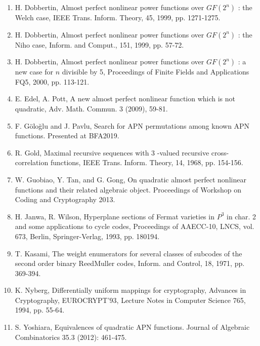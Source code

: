 \documentclass[10pt]{article}
\begin{document}
\begin{enumerate}
  \item H. Dobbertin, Almost perfect nonlinear power functions over $G F\left(2^{n}\right)$ : the Welch case, IEEE Trans. Inform. Theory, 45, 1999, pp. 1271-1275.
  \item H. Dobbertin, Almost perfect nonlinear power functions over $G F\left(2^{n}\right)$ : the Niho case, Inform. and Comput., 151, 1999, pp. 57-72.
  \item H. Dobbertin, Almost perfect nonlinear power functions over $G F\left(2^{n}\right)$ : a new case for $n$ divisible by 5, Proceedings of Finite Fields and Applications FQ5, 2000, pp. 113-121.
  \item E. Edel, A. Pott, A new almost perfect nonlinear function which is not quadratic, Adv. Math. Commun. 3 (2009), 59-81.
  \item F. Göloğlu and J. Pavlu, Search for APN permutations among known APN functions. Presented at BFA2019.
  \item R. Gold, Maximal recursive sequences with 3 -valued recursive cross-correlation functions, IEEE Trans. Inform. Theory, 14, 1968, pp. 154-156.
  \item W. Guobiao, Y. Tan, and G. Gong, On quadratic almost perfect nonlinear functions and their related algebraic object. Proceedings of Workshop on Coding and Cryptography 2013.
  \item H. Janwa, R. Wilson, Hyperplane sections of Fermat varieties in $P^{3}$ in char. 2 and some applications to cycle codes, Proceedings of AAECC-10, LNCS, vol. 673, Berlin, Springer-Verlag, 1993, pp. 180194.
  \item T. Kasami, The weight enumerators for several classes of subcodes of the second order binary ReedMuller codes, Inform. and Control, 18, 1971, pp. 369-394.
  \item K. Nyberg, Differentially uniform mappings for cryptography, Advances in Cryptography, EUROCRYPT'93, Lecture Notes in Computer Science 765, 1994, pp. 55-64.
  \item S. Yoshiara, Equivalences of quadratic APN functions. Journal of Algebraic Combinatorics 35.3 (2012): 461-475.
\end{enumerate}
\end{document}
